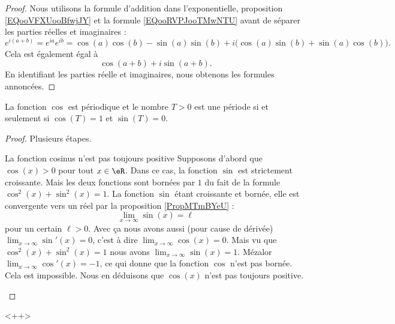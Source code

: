 \begin{proof}
    Nous utilisons la formule d'addition dans l'exponentielle, proposition \eqref{EQooVFXUooBfwjJY} et la formule \eqref{EQooRVPJooTMwNTU} avant de séparer les parties réelles et imaginaires :
    \begin{equation}
        e^{i(a+b)}= e^{ia} e^{ib}=\cos(a)\cos(b)-\sin(a)\sin(b)+i\big( \cos(a)\sin(b)+\sin(a)\cos(b) \big).
    \end{equation}
    Cela est également égal à
    \begin{equation}
        \cos(a+b)+i\sin(a+b).
    \end{equation}
    En identifiant les parties réelle et imaginaires, nous obtenons les formules annoncées.
\end{proof}

\begin{proposition}
    La fonction \( \cos\) est périodique et le nombre \( T>0\) est une période si et seulement si \( \cos(T)=1\) et \( \sin(T)=0\).
\end{proposition}

\begin{proof}
    Plusieurs étapes.
    \begin{subproof}
        \item[La fonction cosinus n'est pas toujours positive]
    Supposons d'abord que \( \cos(x)>0\) pour tout \( x\in \eR\). Dans ce cas, la fonction \( \sin\) est strictement croissante. Mais les deux fonctions sont bornées par \( 1\) du fait de la formule \( \cos^2(x)+\sin^2(x)=1\). La fonction \( \sin\) étant croissante et bornée, elle est convergente vers un réel par la proposition \ref{PropMTmBYeU} :
    \begin{equation}
        \lim_{x\to \infty} \sin(x)=\ell
    \end{equation}
    pour un certain \( \ell>0\). Avec ça nous avons aussi (pour cause de dérivée) \( \lim_{x\to \infty} \sin'(x)=0\), c'est à dire \( \lim_{x\to \infty} \cos(x)=0\). Mais vu que \( \cos^2(x)+\sin^2(x)=1\) nous avons \( \lim_{x\to \infty} \sin(x)=1\). Mézalor \( \lim_{x\to \infty} \cos'(x)=-1\), ce qui donne que la fonction \( \cos\) n'est pas bornée. Cela est impossible. Nous en déduisons que \( \cos(x)\) n'est pas toujours positive.
    \end{subproof}

\end{proof}
<++>

